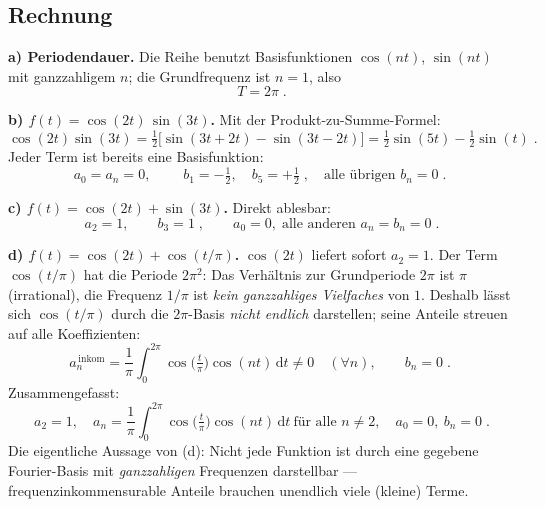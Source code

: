 
\subsection*{Rechnung}
\textbf{a) Periodendauer.} Die Reihe benutzt Basisfunktionen $\cos(nt)$,
$\sin(nt)$ mit ganzzahligem $n$; die Grundfrequenz ist $n=1$, also
\begin{equation}
  \boxed{\;T=2\pi\;}.
\end{equation}

\textbf{b) $f(t)=\cos(2t)\,\sin(3t)$.} Mit der Produkt-zu-Summe-Formel:
\begin{equation}
  \cos(2t)\sin(3t)=\tfrac12\big[\sin(3t+2t)-\sin(3t-2t)\big]
  =\tfrac12\sin(5t)-\tfrac12\sin(t)\;.
\end{equation}
Jeder Term ist bereits eine Basisfunktion:
\begin{equation}
  a_0=a_n=0,\qquad
  \boxed{\;b_1=-\tfrac12,\quad b_5=+\tfrac12\;},\quad
  \text{alle übrigen }b_n=0\;.
\end{equation}

\textbf{c) $f(t)=\cos(2t)+\sin(3t)$.} Direkt ablesbar:
\begin{equation}
  \boxed{\;a_2=1,\qquad b_3=1\;},\qquad
  a_0=0,\; \text{alle anderen }a_n=b_n=0\;.
\end{equation}

\textbf{d) $f(t)=\cos(2t)+\cos(t/\pi)$.}
$\cos(2t)$ liefert sofort $a_2=1$. Der Term $\cos(t/\pi)$ hat die Periode
$2\pi^2$: Das Verhältnis zur Grundperiode $2\pi$ ist $\pi$ (irrational),
die Frequenz $1/\pi$ ist \emph{kein ganzzahliges Vielfaches} von $1$. Deshalb
lässt sich $\cos(t/\pi)$ durch die $2\pi$-Basis \emph{nicht endlich} darstellen;
seine Anteile streuen auf alle Koeffizienten:
\begin{equation}
  a_n^{\,\mathrm{inkom}}
  =\frac1\pi\int_0^{2\pi}\cos\!\big(\tfrac{t}{\pi}\big)\cos(nt)\,\mathrm dt
  \neq 0 \quad(\forall n),\qquad
  b_n=0\;.
\end{equation}
Zusammengefasst:
\begin{equation}
  \boxed{\;a_2=1,\quad a_n=\frac1\pi\int_0^{2\pi}\cos\!\big(\tfrac{t}{\pi}\big)
  \cos(nt)\,\mathrm dt\ \text{für alle }n\neq2,\quad a_0=0,\ b_n=0\;}.
\end{equation}
Die eigentliche Aussage von (d): Nicht jede Funktion ist durch eine
gegebene Fourier-Basis mit \emph{ganzzahligen} Frequenzen darstellbar ---
frequenzinkommensurable Anteile brauchen unendlich viele (kleine) Terme.

